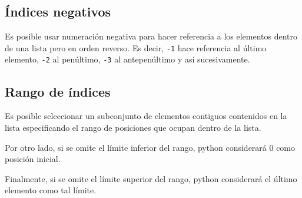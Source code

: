 \subsection{Índices negativos}

Es posible usar numeración negativa para hacer referencia a los
elementos dentro de una lista pero en orden reverso. Es decir,
\texttt{-1} hace referencia al último elemento, \texttt{-2} al
penúltimo, \texttt{-3} al antepenúltimo y así sucesivamente.

\subsection{Rango de índices}

Es posible seleccionar un subconjunto de elementos contiguos contenidos
en la lista especificando el rango de posiciones que ocupan dentro de la
lista.

\begin{Shaded}
\begin{Highlighting}[]
\OperatorTok{=}\NormalTok{ [}\NormalTok{, }\NormalTok{, }\NormalTok{, }\NormalTok{, }\NormalTok{, }
            \NormalTok{, }\NormalTok{, }\NormalTok{]}
    \NormalTok{(lista[}\NormalTok{:}\NormalTok{])}
\end{Highlighting}
\end{Shaded}

Por otro lado, si se omite el límite inferior del rango, python
considerará 0 como posición inicial.

\begin{Shaded}
\begin{Highlighting}[]
\OperatorTok{=}\NormalTok{ [}\NormalTok{, }\NormalTok{, }\NormalTok{, }\NormalTok{, }\NormalTok{, }
            \NormalTok{, }\NormalTok{, }\NormalTok{]}
    \NormalTok{(lista[:}\NormalTok{])}
\end{Highlighting}
\end{Shaded}

Finalmente, si se omite el límite superior del rango, python considerará
el último elemento como tal límite.

